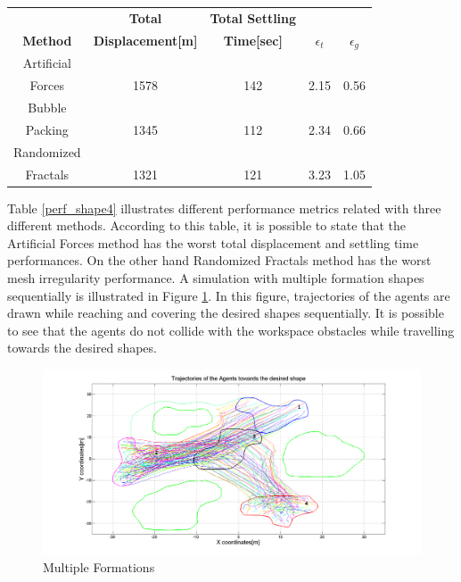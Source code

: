 	
\begin{center}
 \label{perf_shape4} 
\begin{tabular}{|c|c|c|c|c|}
					
\hline
\textbf{} & \textbf{Total}  & \textbf{Total Settling} & \textbf{} & \textbf{} \\ \textbf{Method} & \textbf{Displacement[m]} & \textbf{Time[sec]}& \textbf{$\epsilon_t$} & \textbf{$\epsilon_g$} \\
\hline
Artificial&  &  &  & \\
 Forces & 1578 & 142& 2.15 & 0.56\\
 \hline
 Bubble&  &  &  & \\
 Packing &1345 &112 &2.34 & 0.66\\
\hline
 Randomized&  &  &  & \\
 Fractals &1321 &121 &3.23 & 1.05\\
\hline
\end{tabular}
\end{center}

Table \ref{perf_shape4} illustrates different performance metrics related with three different methods. According to this table, it is possible to state that the Artificial Forces method has the worst total displacement and settling time performances. On the other hand Randomized Fractals method has the worst mesh irregularity performance. A simulation with multiple formation shapes sequentially is illustrated in Figure \ref{multiple_formation_ref}. In this figure, trajectories of the agents are drawn while reaching and covering the desired shapes sequentially. It is possible to see that the agents do not collide with the workspace obstacles while travelling towards the desired shapes.

\begin{figure}[H]
\caption{Multiple Formations} \label{multiple_formation_ref}
\centerline{\includegraphics[scale = 0.33]{multiple_formation}}
\end{figure} 
		
